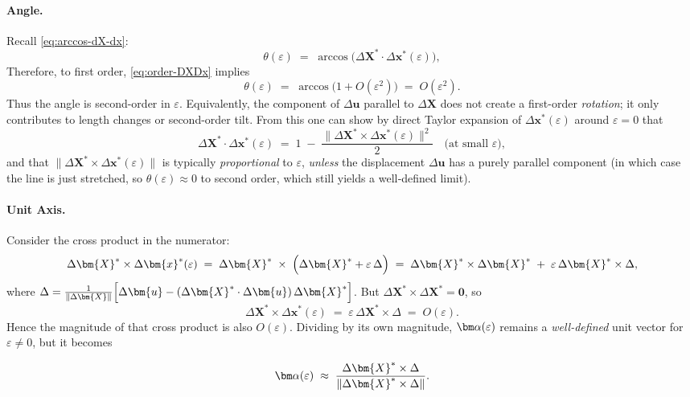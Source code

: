 \paragraph{Angle.}

Recall \eqref{eq:arccos-dX-dx}:
\[
  \theta(\varepsilon)
  \;=\;
  \arccos \bigl(
    \Delta \bm{X}^*\cdot \Delta \bm{x}^*(\varepsilon)
  \bigr),
\] 
Therefore, to first order, \eqref{eq:order-DXDx} implies
\[
  \theta(\varepsilon)
  \;=\;
  \arccos \bigl(1 + O(\varepsilon^2)\bigr)
  \;=\;
  O(\varepsilon^2).
\]
Thus the angle is second-order in
\(\varepsilon\). 
Equivalently, the component of \(\Delta \bm{u}\)
parallel to \(\Delta \bm{X}\) does not create a first-order
\emph{rotation}; it only contributes to length changes or second-order tilt.
From this one can show by direct Taylor expansion of
\(\Delta \bm{x}^*(\varepsilon)\) around \(\varepsilon=0\) that 
\[
  \Delta \bm{X}^*\cdot \Delta \bm{x}^*(\varepsilon)
  \;=\;
  1 
  \;-\;
  \frac{\bigl\|\Delta \bm{X}^*\times \Delta \bm{x}^*(\varepsilon)\bigr\|^2}{2}
  \quad\text{(at small }\varepsilon\text{)},
\] and that
\(\bigl\|\Delta \bm{X}^*\times \Delta \bm{x}^*(\varepsilon)\bigr\|\) is
typically \emph{proportional} to \(\varepsilon\), \emph{unless} the
displacement \(\Delta \bm{u}\) has a purely parallel component (in which
case the line is just stretched, so \(\theta(\varepsilon)\approx 0\) to
second order, which still yields a well‐defined limit).

\paragraph{Unit Axis.}

Consider the cross product in the numerator: 
\[
  \Delta \bm{X}^* \times \Delta \bm{x}^*(\varepsilon)
  \;=\;
  \Delta \bm{X}^* \;\times\;
  \Bigl(\Delta \bm{X}^* + \varepsilon\,\Delta\Bigr)
  \;=\;
  \Delta \bm{X}^* \times \Delta \bm{X}^*
  \;+\;
  \varepsilon\,\Delta \bm{X}^*\times\Delta,
\]
where
\(\Delta = \tfrac{1}{\|\Delta \bm{X}\|}\Bigl[\Delta \bm{u} - (\Delta \bm{X}^*\cdot\Delta \bm{u})\,\Delta \bm{X}^*\Bigr]\).
But \(\Delta \bm{X}^* \times \Delta \bm{X}^* = \mathbf{0}\), so \[
  \Delta \bm{X}^* \times \Delta \bm{x}^*(\varepsilon)
  \;=\;
  \varepsilon\,\Delta \bm{X}^*\times\Delta
  \;=\;
  O(\varepsilon).
\]
Hence the magnitude of that cross product is also \(O(\varepsilon)\).
Dividing by its own magnitude, \(\AlignAxis(\varepsilon)\) remains a
\emph{well-defined} unit vector for \(\varepsilon\neq 0\), but it
 becomes

\[
  \AlignAxis(\varepsilon)
  \;\approx\;
  \frac{\Delta \bm{X}^*\times \Delta}{\|\Delta \bm{X}^*\times \Delta\|}.
\]


